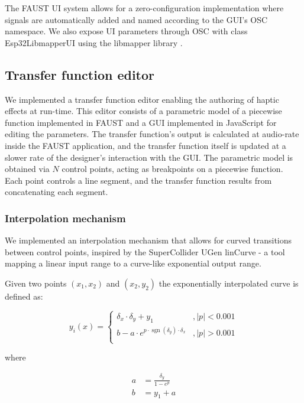 \documentclass[sigconf]{nimeart}
\begin{document}
The FAUST UI system allows for a zero-configuration implementation where signals are automatically added and named according to the GUI's OSC namespace. We also expose UI parameters through OSC with class Esp32LibmapperUI using the libmapper library \cite{Malloch2013Libmapper}.

\subsection{Transfer function editor}\label{transfer-function-editor}

We implemented a transfer function editor enabling the authoring of haptic effects at run-time. This editor consists of a parametric model of a piecewise function implemented in FAUST and a GUI implemented in JavaScript for editing the parameters. The transfer function's output is calculated at audio-rate inside the FAUST application, and the transfer function itself is updated at a slower rate of the designer's interaction with the GUI. The parametric model is obtained via $N$ control points, acting as breakpoints on a piecewise function. Each point controls a line segment, and the transfer function results from concatenating each segment.

\subsubsection{Interpolation mechanism}\label{interpolation-mechanism}

We implemented an interpolation mechanism that allows for curved transitions between control points, inspired by the SuperCollider UGen linCurve \cite{SuperCollider} - a tool mapping a linear input range to a curve-like exponential output range.

Given two points $(x_1,x_2)$ and $(x_2,y_2)$ the exponentially interpolated curve is defined as:


\begin{equation}%
      y_i(x) = 
      \begin{cases}
      \delta_x \cdot \delta_y + y_1 &, |p| < 0.001 \\
       b - a \cdot e^{p\cdot \operatorname{sgn}(\delta_{y}) \cdot \delta_x} &, |p| > 0.001 \\
      \end{cases}\end{equation}


where


\begin{equation}\begin{aligned}
      a &= \frac{\delta_y}{1-e^p} \\ 
      b &=y_1 + a\end{aligned}\end{equation}
\end{document}

